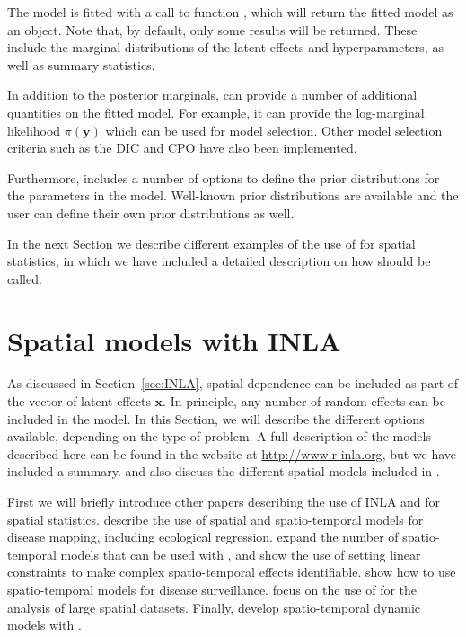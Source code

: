 \documentclass[article]{jss}
\begin{document}
The model is fitted with a call to function , which will return the fitted model as an
 object. Note that, by default, only some results will be returned. These include the marginal distributions of
the latent effects and hyperparameters, as well as summary statistics. 


In addition to the posterior marginals,  can provide a number
of additional quantities on the fitted model. For example, it can 
provide the log-marginal likelihood $\pi(\mathbf{y})$ which can be used
for model selection. Other model selection criteria such as the DIC 
\citep{Spiegelhalteretal:2002} and CPO \citep{Heldetal:2010} have also
been implemented.

Furthermore,  includes a number of options to define the
prior distributions for the parameters in the model. Well-known
prior distributions are available and the user can define their own prior
distributions as well.

In the next Section we describe different examples of the use of
 for spatial statistics, in which we have included
a detailed description on how  should be called.

\section{Spatial models with INLA} \label{sec:spmodels}


As discussed in Section~\ref{sec:INLA}, spatial dependence can be included as
part of the vector of latent effects $\mathbf{x}$. In principle, any number of
random effects can be included in the model. In this Section, we will describe
the different options available, depending on the type of problem. A full
description of the models described here can be found in the 
website at \url{http://www.r-inla.org}, but we have included a summary.
\citet{Blangiardoetal:2013} and \citet{GomezRubioetal:2013} also discuss
the different spatial models included in .


First we will briefly introduce other papers describing the use of INLA and  for spatial statistics. \citet{SchrodleHeld:2010} %
 describe the use of spatial
and spatio-temporal models for disease mapping, including ecological regression.
\citet{SchrodleHeld:2011} expand the number of spatio-temporal models that
can be used with , and show the use of setting linear constraints to make complex spatio-temporal effects identifiable. 
\citet{isi:000288017300007} show how to use spatio-temporal models
for disease surveillance. \citet{Eidsviketal:2012} focus on the use
of  for the analysis of large spatial datasets. Finally, 
\citet{Ruiz-Cardenasetal:2012} develop spatio-temporal dynamic models
with .
\end{document}
